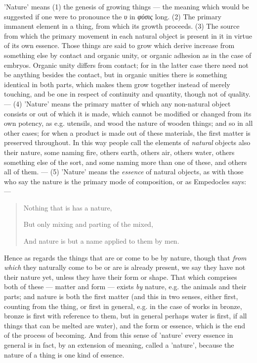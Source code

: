'Nature' means (1) the genesis of growing things — the meaning which would be suggested if one were to pronounce
the \emph{υ} in \emph{φύσις} long. (2) The primary immanent element in a thing, from which its growth proceeds. (3) The source from which the primary movement in each natural object is present in it in virtue of its own essence. Those things are said to grow which derive increase from something else by contact and organic unity, or organic adhesion as in the case of embryos. Organic unity differs from contact; for in the latter case there need not be anything besides the contact, but in organic unities there is something identical in both parts, which makes them grow together instead of merely touching, and be one in respect of continuity and quantity, though not of quality.— (4) 'Nature' means the primary matter of which any non-natural object consists or out of which it is made, which cannot be modified or changed from its own potency, as e.g. utensils, and wood the nature of wooden things; and so in all other cases; for when a product is made out of these materials, the first matter is preserved throughout. In this way people call the elements of \emph{natural} objects also their nature, some naming fire, others earth, others air, others water, others something else of the sort, and some naming more than one of these, and others all of them. — (5) 'Nature' means the \emph{essence} of natural objects, as with those who say the nature is the primary mode of composition, or as Empedocles says:—

\begin{quote}

Nothing that is has a nature,

But only mixing and parting of the mixed,

And nature is but a name applied to them by men.

\end{quote}

Hence as regards the things that are or come to be by nature, though that \emph{from which} they naturally come to be or are is already present, we say they have not their nature yet, unless they have their form or shape. That which comprises both of these — matter and form — exists \emph{by} nature, e.g. the animals and their parts; and nature is both the first matter (and this in two senses, either first, counting from the thing, or first in general, e.g. in the case of works in bronze, bronze is first with reference to them, but in general perhaps water is first, if all things that can be melted are water), and the form or essence, which is the end of the process of becoming. And from this sense of 'nature' every essence in general is in fact, by an extension of meaning, called a 'nature', because the nature of a thing is one kind of essence.

